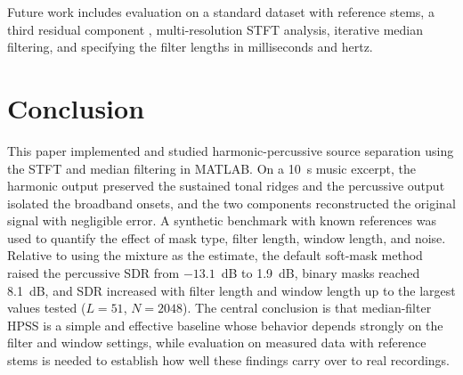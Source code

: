 \documentclass[conference]{IEEEtran}
\begin{document}
Future work includes evaluation on a standard dataset with reference stems, a third residual component \cite{driedger2014}, multi-resolution STFT analysis, iterative median filtering, and specifying the filter lengths in milliseconds and hertz.

\section{Conclusion}
This paper implemented and studied harmonic-percussive source separation using the STFT and median filtering in MATLAB. On a 10~s music excerpt, the harmonic output preserved the sustained tonal ridges and the percussive output isolated the broadband onsets, and the two components reconstructed the original signal with negligible error. A synthetic benchmark with known references was used to quantify the effect of mask type, filter length, window length, and noise. Relative to using the mixture as the estimate, the default soft-mask method raised the percussive SDR from $-13.1$~dB to 1.9~dB, binary masks reached 8.1~dB, and SDR increased with filter length and window length up to the largest values tested ($L=51$, $N=2048$). The central conclusion is that median-filter HPSS is a simple and effective baseline whose behavior depends strongly on the filter and window settings, while evaluation on measured data with reference stems is needed to establish how well these findings carry over to real recordings.
\end{document}
